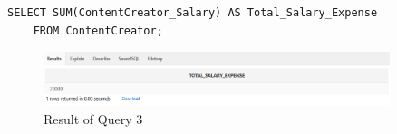 \begin{lstlisting}[caption={ Query 3},label={lst:q-3}]
    SELECT SUM(ContentCreator_Salary) AS Total_Salary_Expense
    FROM ContentCreator;
\end{lstlisting}
\begin{figure}[H]
    \centering
    \includegraphics[width=0.9\textwidth]{images/dml/GroupFun/Q3.png}
    \caption{Result of Query 3}
    \label{fig:Result of Query 3}
\end{figure}
\clearpage